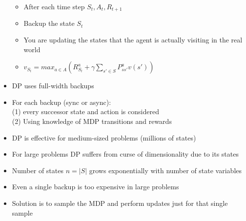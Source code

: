 \documentclass[12pt]{article}
\begin{document}
\begin{itemize}
\begin{itemize}
      \item After each time step $S_t, A_t, R_{t+1}$
      \item Backup the state $S_t$
      \item You are updating the states that the agent is actually visiting in the real world
      \item $v_{S_t} = max_{a \in A}(R_{S_t}^a + \gamma \sum_{s' \in S}P_{ss'}^a v(s'))$
    \end{itemize}
    \item DP uses full-width backups
    \item For each backup (sync or async): \\
    (1) every successor state and action is considered \\
    (2) Using knowledge of MDP transitions and rewards
    \item DP is effective for medium-sized problems (millions of states)
    \item For large problems DP suffers from curse of dimensionality due to its states
    \item Number of states $n = \vert S \vert$ grows exponentially with number of state
    variables
    \item Even a single backup is too expensive in large problems
    \item Solution is to sample the MDP and perform updates just for that single sample
  \end{itemize}
\end{document}
